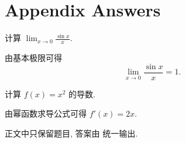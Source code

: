 \documentclass[
  a4paper,
  12pt,
  oneside,
  answers=true,
  solutions=appendix
]{maki-notes}
\begin{document}
\mainmatter

\chapter{Appendix Answers}

\begin{exercise}[极限]
\label{ex:appendix-limit}
计算 \(\lim_{x\to 0}\frac{\sin x}{x}\).
\end{exercise}

\begin{solution}
由基本极限可得
\[
  \lim_{x\to 0}\frac{\sin x}{x}=1.
\]
\end{solution}

\begin{exercise}[导数]
\label{ex:appendix-derivative}
计算 \(f(x)=x^2\) 的导数.
\end{exercise}

\begin{solution}
由幂函数求导公式可得 \(f'(x)=2x\).
\end{solution}

正文中只保留题目, 答案由 \texttt{\string\PrintSolutions} 统一输出.

\PrintSolutions
\end{document}

